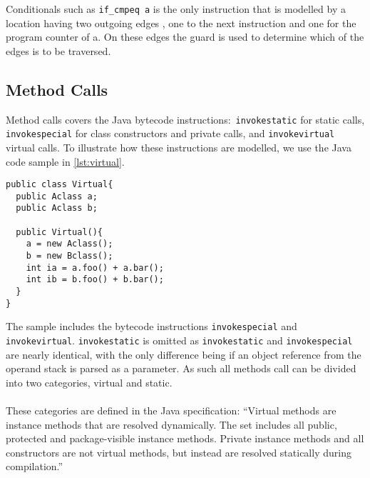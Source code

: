 Conditionals such as \texttt{if\_cmpeq a} is the only instruction that is modelled by a location having two outgoing edges , one to the next instruction and one for the program counter of a. On these edges the guard is used to determine which of the edges is to be traversed. 

\subsection{Method Calls}\label{subsubsec:method}
Method calls covers the Java bytecode instructions:~\texttt{invokestatic} for static calls, \texttt{invokespecial} for class constructors and private calls, and \texttt{invokevirtual} virtual calls. To illustrate how these instructions are modelled, we use the Java code sample in \cref{lst:virtual}.
\begin{lstlisting}[caption={\texttt{Bclass} extends \texttt{Aclass}, \texttt{Aclass} implements the methods foo and bar, and \texttt{Bclass} overwrites foo.}, label={lst:virtual}]
public class Virtual{
  public Aclass a;
  public Aclass b;

  public Virtual(){
    a = new Aclass();
    b = new Bclass();
    int ia = a.foo() + a.bar();
    int ib = b.foo() + b.bar();
  }
}
\end{lstlisting}
The sample includes the bytecode instructions \texttt{invokespecial} and \texttt{invokevirtual}.
\texttt{invokestatic} is omitted as \texttt{invokestatic} and \texttt{invokespecial} are nearly identical, with the only difference being if an object reference from the operand stack is parsed as a parameter.
As such all methods call can be divided into two categories, virtual and static.\\\\
These categories are defined in the Java specification: ``Virtual methods are instance methods that are resolved dynamically. The set includes all public, protected and package-visible instance methods. Private instance methods and all constructors are not virtual methods, but instead are resolved statically during compilation.'' \cite[chap. 4.3.7.6]{java_card_spec}

